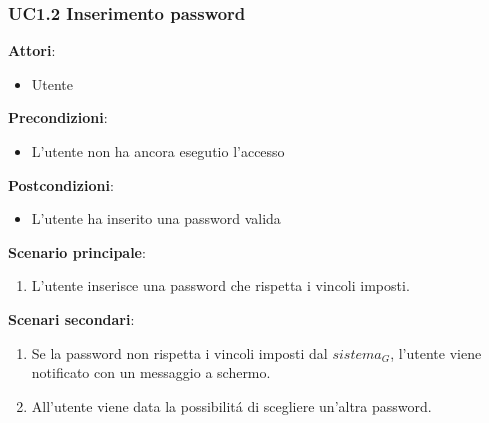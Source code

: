 \subsubsection{UC1.2 Inserimento password}\label{usecase:1_2}
\textbf{Attori}:
\begin{itemize}
    \item Utente
\end{itemize}
\textbf{Precondizioni}:
\begin{itemize}
    \item L'utente non ha ancora esegutio l'accesso
\end{itemize}
\textbf{Postcondizioni}:
\begin{itemize}
    \item L'utente ha inserito una password valida
\end{itemize}
\textbf{Scenario principale}:
\begin{enumerate}
    \item L'utente inserisce una password che rispetta i vincoli imposti.
\end{enumerate}
\textbf{Scenari secondari}:
\begin{enumerate}
    \item Se la password non rispetta i vincoli imposti dal $\textit{sistema}_G$, l'utente viene notificato con un messaggio a schermo.
    \item All'utente viene data la possibilitá di scegliere un'altra password.
\end{enumerate}         